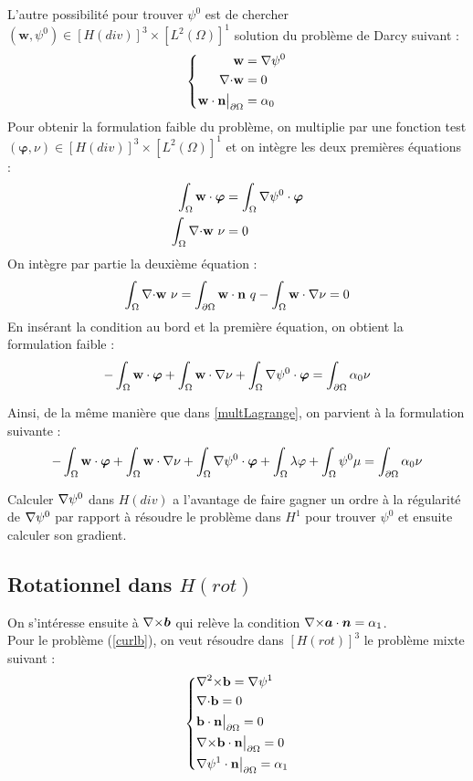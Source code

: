 L'autre possibilité pour trouver $\psi^0$ est de chercher $(\mathbf{w},\psi^0)\in [H(div)]^3\times [L^2(\Omega)]^1$ solution du problème de Darcy suivant :
\begin{equation}\label{pbpsidiv}
\left\{\begin{aligned}
\mathbf{w} &= {\nabla} \psi^0\\
{\nabla\cdot} \mathbf{w} &= 0\\
\mathbf{w}\cdot \mathbf{n}{\big\rvert_{\partial\Omega}} &= \alpha_0
\end{aligned}\right.
\end{equation}
Pour obtenir la formulation faible du problème, on multiplie par une fonction test $(\bm{\varphi},\nu)\in [H(div)]^3\times [L^2(\Omega)]^1$ et on intègre les deux premières équations :
\begin{align*}
\int_\Omega \mathbf{w}\cdot\bm{\varphi} &= \int_\Omega {\nabla}\psi^0\cdot\bm{\varphi}\\
\int_\Omega {\nabla\cdot} \mathbf{w}\ \nu &= 0
\end{align*}
On intègre par partie la deuxième équation :
\[ \int_\Omega {\nabla\cdot} \mathbf{w}\ \nu = \int_{\partial\Omega} \mathbf{w}\cdot \mathbf{n}\ q - \int_\Omega \mathbf{w}\cdot{\nabla}\nu = 0  \]
En insérant la condition au bord et la première équation, on obtient la formulation faible :
\[ -\int_\Omega \mathbf{w}\cdot\bm{\varphi} + \int_\Omega \mathbf{w}\cdot{\nabla}\nu + \int_\Omega {\nabla}\psi^0\cdot\bm{\varphi}  = \int_{\partial\Omega} \alpha_0\nu \]

 Ainsi, de la même manière que dans \ref{multLagrange}, on parvient à la formulation suivante :
\begin{equation}\label{fvpsidiv}
-\int_\Omega \mathbf{w}\cdot\bm{\varphi} + \int_\Omega \mathbf{w}\cdot{\nabla}\nu + \int_\Omega {\nabla}\psi^0\cdot\bm{\varphi} + \int_\Omega \lambda\varphi + \int_\Omega \psi^0\mu = \int_{\partial\Omega} \alpha_0\nu
\end{equation}

Calculer ${\nabla}\psi^0$ dans $H(div)$ a l'avantage de faire gagner un ordre à la régularité de ${\nabla}\psi^0$ par rapport à résoudre le problème dans $H^1$ pour trouver $\psi^0$ et ensuite calculer son gradient.\\

\subsection{Rotationnel dans $H(rot)$}
On s'intéresse ensuite à ${\nabla\times}\bm{b}$ qui relève la condition ${\nabla\times}\bm{a}\cdot\bm{n}=\alpha_1$.\\
Pour le problème (\ref{curlb}), on veut résoudre dans $[H(rot)]^3$ le problème mixte suivant : 
\begin{equation}\label{pbbcurl}
\left\{\begin{aligned}
&{\nabla^2\times} \mathbf{b} = {\nabla}\psi^1\\
&{\nabla\cdot} \mathbf{b} = 0\\
&\mathbf{b}\cdot \mathbf{n}{\big\rvert_{\partial\Omega}} = 0\\
&{\nabla\times} \mathbf{b}\cdot \mathbf{n}{\big\rvert_{\partial\Omega}} = 0\\
&{\nabla}\psi^1\cdot \mathbf{n}{\big\rvert_{\partial\Omega}} = \alpha_1
\end{aligned}\right.
\end{equation}

